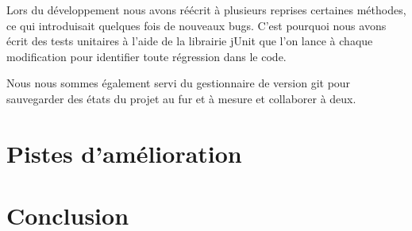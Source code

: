 \documentclass[a4paper, 11pt, DIV=9]{scrartcl}
\begin{document}
Lors du développement nous avons réécrit à plusieurs reprises certaines
méthodes, ce qui introduisait quelques fois de nouveaux bugs. C'est pourquoi
nous avons écrit des tests unitaires à l'aide de la librairie jUnit que l'on lance à
chaque modification pour identifier toute régression dans le code.

Nous nous sommes également servi du gestionnaire de version git pour sauvegarder
des états du projet au fur et à mesure et collaborer à deux.
\section{Pistes d'amélioration}
\section{Conclusion}
\end{document}
